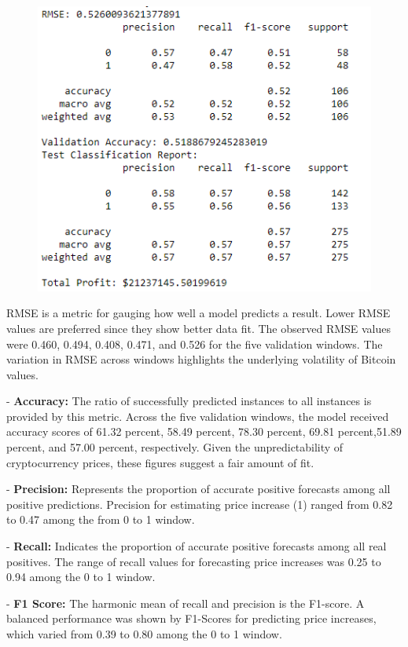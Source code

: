 \begin{figure}[H]
\centering
\includegraphics[scale=0.85]{fig3.jpg}
\end{figure}

RMSE is a metric for gauging how well a model predicts a result. Lower RMSE values are preferred since they show better data fit. The observed RMSE values were 0.460, 0.494, 0.408, 0.471, and 0.526 for the five validation windows. The variation in RMSE across windows highlights the underlying volatility of Bitcoin values.

-	\textbf{Accuracy:} The ratio of successfully predicted instances to all instances is provided by this metric. Across the five validation windows, the model received accuracy scores of 61.32 percent, 58.49 percent, 78.30 percent, 69.81 percent,51.89 percent, and 57.00 percent, respectively. Given the unpredictability of cryptocurrency prices, these figures suggest a fair amount of fit.

-	\textbf{Precision:} Represents the proportion of accurate positive forecasts among all positive predictions. Precision for estimating price increase (1) ranged from 0.82 to 0.47 among the from 0 to 1 window.

-	\textbf{Recall:} Indicates the proportion of accurate positive forecasts among all real positives. The range of recall values for forecasting price increases was 0.25 to 0.94 among the 0 to 1 window.

-	\textbf{F1 Score:} The harmonic mean of recall and precision is the F1-score. A balanced performance was shown by F1-Scores for predicting price increases, which varied from 0.39 to 0.80 among the 0 to 1 window.


